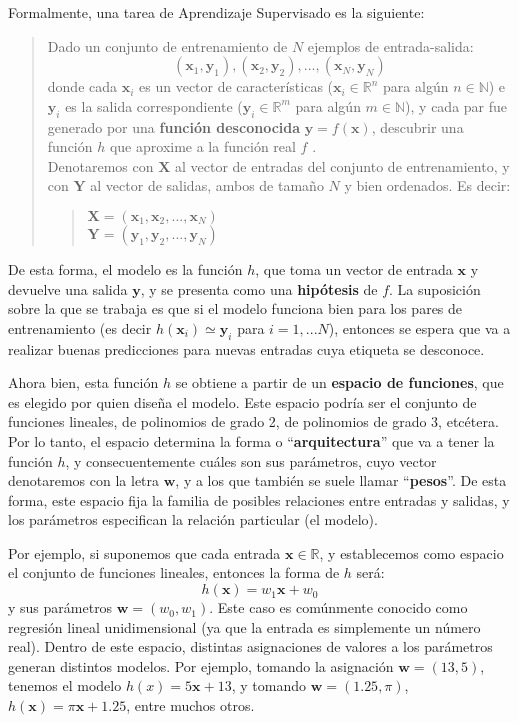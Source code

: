 \documentclass[../../main.tex]{subfiles}
\begin{document}
Formalmente, una tarea de Aprendizaje Supervisado es la siguiente:
\begin{quote}
    Dado un conjunto de entrenamiento de \(N\) ejemplos de entrada-salida:
    \[(\bm{x}_1, \bm{y}_1), (\bm{x}_2, \bm{y}_2), ..., (\bm{x}_N,
    \bm{y}_N)\] donde cada \(\bm{x}_i\) es un vector de características
    (\(\bm{x}_i \in \mathbb{R}^n\) para algún \(n \in \mathbb{N}\)) e \(\bm{y}_i\)
    es la salida correspondiente (\(\bm{y}_i \in \mathbb{R}^m\) para algún \(m \in
    \mathbb{N}\)), y cada par fue generado por una \textbf{función desconocida}
    \(\bm{\bm{y}}=f(\bm{x})\), descubrir una función \(h\) que aproxime a la
    función real \(f\) \cite{ai-a-modern-approach}.\\
    Denotaremos con \(\bm{X}\) al vector de entradas del conjunto de entrenamiento, y
    con \(\bm{Y}\) al vector de salidas, ambos de tamaño \(N\) y bien ordenados. Es
    decir:
    \begin{quote}
        \(\bm{X}=(\bm{x}_1, \bm{x}_2, ..., \bm{x}_N)\)\\
        \(\bm{Y}=(\bm{y}_1, \bm{y}_2, ..., \bm{y}_N)\)
    \end{quote}
\end{quote}
De esta forma, el modelo es la función \(h\), que toma un vector de entrada \(\bm{x}\) y
devuelve una salida \(\bm{y}\), y se presenta como una \textbf{hipótesis} de \(f\). La
suposición sobre la que se trabaja es que si el modelo funciona bien para los pares de
entrenamiento (es decir \(h(\bm{x}_i) \simeq \bm{y}_i\) para \(i=1,...N\)), entonces se
espera que va a realizar buenas predicciones para nuevas entradas cuya etiqueta se
desconoce.

Ahora bien, esta función \(h\) se obtiene a partir de un \textbf{espacio de funciones},
que es elegido por quien diseña el modelo. Este espacio podría ser el conjunto de
funciones lineales, de polinomios de grado 2, de polinomios de grado 3, etcétera. Por lo
tanto, el espacio determina la forma o ``\textbf{arquitectura}'' que va a tener la función
\(h\), y consecuentemente cuáles son sus parámetros, cuyo vector denotaremos con la letra
\(\bm{\bm{w}}\), y a los que también se suele llamar ``\textbf{pesos}''. De esta forma,
este espacio fija la familia de posibles relaciones entre entradas y salidas, y los
parámetros especifican la relación particular (el modelo).

Por ejemplo, si suponemos que cada entrada \(\bm{x} \in \mathbb{R}\), y establecemos
como espacio el conjunto de funciones lineales, entonces la forma de \(h\) será:
\[h(\bm{x}) = w_1 \bm{x} + w_0\] y sus parámetros \(\bm{w}=(w_0, w_1)\). Este caso
es comúnmente conocido como regresión lineal unidimensional (ya que la entrada es
simplemente un número real). Dentro de este espacio, distintas asignaciones de valores
a los parámetros generan distintos modelos. Por ejemplo, tomando la asignación
\(\bm{w}=(13, 5)\), tenemos el modelo \(h(x) = 5\bm{x} + 13\), y tomando \(\bm{w}=(1{.}25, \pi)\),
\(h(\bm{x}) = \pi \bm{x} + 1{.}25\), entre muchos otros.
\end{document}
